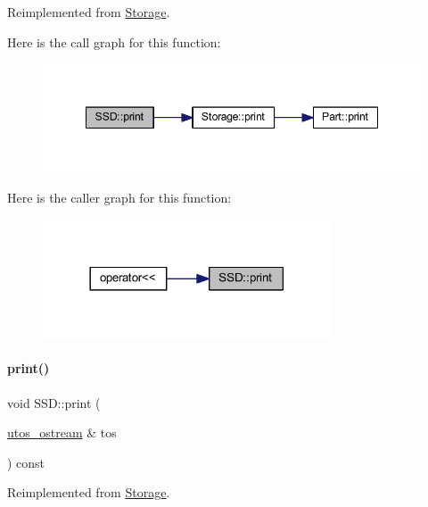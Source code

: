 Reimplemented from \mbox{\hyperlink{class_storage_aa9f6ffb0fd45839b54bd4e254270445d}{Storage}}.

Here is the call graph for this function\+:
\nopagebreak
\begin{figure}[H]
\begin{center}
\leavevmode
\includegraphics[width=348pt]{class_s_s_d_a3c07aa0fd7bb547cfb4a775513e427a9_cgraph}
\end{center}
\end{figure}
Here is the caller graph for this function\+:
\nopagebreak
\begin{figure}[H]
\begin{center}
\leavevmode
\includegraphics[width=242pt]{class_s_s_d_a3c07aa0fd7bb547cfb4a775513e427a9_icgraph}
\end{center}
\end{figure}
\mbox{\label{class_s_s_d_ab07086e302f8be99cfa757583d2017a0}} 
\paragraph{\texorpdfstring{print()}{print()}\hspace{0.1cm}{\footnotesize\ttfamily [2/4]}}
{\footnotesize\ttfamily void S\+S\+D\+::print (\begin{DoxyParamCaption}\item[{\mbox{\hyperlink{structutos__ostream}{utos\+\_\+ostream}} \&}]{tos }\end{DoxyParamCaption}) const\hspace{0.3cm}{\ttfamily [virtual]}}



Reimplemented from \mbox{\hyperlink{class_storage_ab7ecf9e0777891b4e1a84bbf391a1cd4}{Storage}}.


